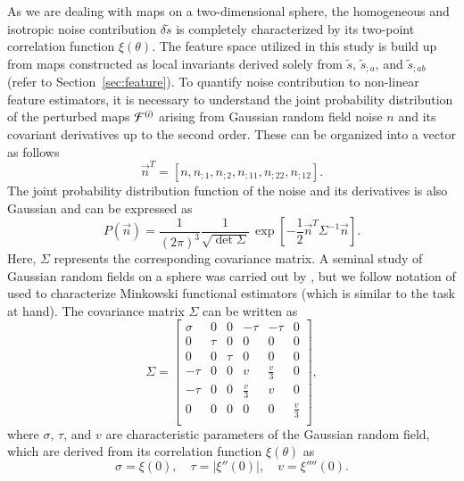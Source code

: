 \documentclass{aa}
\begin{document}
As we are dealing with maps on a two-dimensional sphere, the homogeneous and isotropic noise contribution $\delta\tilde{s}$ is completely characterized by its two-point correlation function $\xi(\theta)$. The feature space utilized in this study is build up from maps constructed as local invariants derived solely from $\tilde{s}$, $\tilde{s}_{;a}$, and $\tilde{s}_{;ab}$ (refer to Section~\ref{sec:feature}). To quantify noise contribution to non-linear feature estimators, it is necessary to understand the joint probability distribution of the perturbed maps ${\cal F}^{(i)}$ arising from Gaussian random field noise $n$ and its covariant derivatives up to the second order. These can be organized into a vector as follows
%
\begin{equation}
  \vec{n}^T = \left[ n, n_{;1}, n_{;2}, n_{;11}, n_{;22}, n_{;12} \right] .
\end{equation}
%
The joint probability distribution function of the noise and its derivatives is also Gaussian and can be expressed as
%
\begin{equation}\label{A.3}
  P(\vec{n}) = \frac{1}{(2\pi)^3} \frac{1}{\sqrt{\det\Sigma}}\,
    \exp\left[ - \frac{1}{2} \vec{n}^T\Sigma^{-1}\vec{n} \right] .
\end{equation}
%
Here, $\Sigma$ represents the corresponding covariance matrix. A seminal study of Gaussian random fields on a sphere was carried out by \cite{1987MNRAS.226..655B}, but we follow notation of \cite{1998MNRAS.297..355S} used to characterize Minkowski functional estimators (which is similar to the task at hand). The covariance matrix $\Sigma$ can be written as 
%
\begin{equation}
  \Sigma = \left[\begin{matrix}
    \sigma & 0 & 0 & -\tau & -\tau & 0\\
    0 & \tau & 0 & 0 & 0 & 0\\
    0 & 0 & \tau & 0 & 0 & 0\\
    -\tau & 0 & 0 & v & \frac{v}{3} & 0\\
    -\tau & 0 & 0 & \frac{v}{3} & v & 0\\
    0 & 0 & 0 & 0 & 0 & \frac{v}{3}\\
  \end{matrix}\right],
\end{equation}
%
where $\sigma$, $\tau$, and $v$ are characteristic parameters of the Gaussian random field, which are derived from its correlation function $\xi(\theta)$ as \cite{Tomita:1990}
%
\begin{equation}\label{A.5}
  \sigma = \xi(0), \hspace{1em}
  \tau = |\xi''(0)|, \hspace{1em}
  v = \xi''''(0) .
\end{equation}
\end{document}
